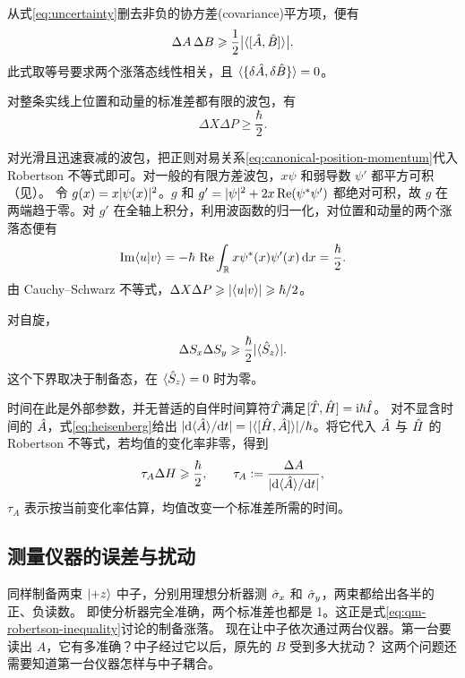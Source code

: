 \begin{corollary}
    从式\eqref{eq:uncertainty}删去非负的协方差(covariance)平方项，便有
    \begin{equation}\label{eq:qm-robertson-inequality}
        \Delta A\,\Delta B \geqslant \frac12\bigl\lvert\langle[\hat{A},\hat{B}]\rangle\bigr\rvert.
    \end{equation}
    此式取等号要求两个涨落态线性相关，且 $\langle\{\delta \hat{A},\delta \hat{B}\}\rangle = 0$。
\end{corollary}

\begin{corollary}
    对整条实线上位置和动量的标准差都有限的波包，有
    \begin{equation}
        \Delta X \Delta P \geq \frac\hbar2.
    \end{equation}
\end{corollary}
对光滑且迅速衰减的波包，把正则对易关系\eqref{eq:canonical-position-momentum}代入 Robertson 不等式即可。对一般的有限方差波包，$x\psi$ 和弱导数 $\psi'$ 都平方可积（见）。
令 $g(x) = x\lvert\psi(x)\rvert^2$。$g$ 和 $g' = \lvert\psi\rvert^2 + 2x\operatorname{Re}(\psi^\ast\psi')$ 都绝对可积，故 $g$ 在两端趋于零。对 $g'$ 在全轴上积分，利用波函数的归一化，对位置和动量的两个涨落态便有
\[
    \operatorname{Im}\langle u\vert v\rangle = -\hbar\,\operatorname{Re}\int_{\mathbb{R}} x\psi^\ast(x)\psi'(x)\mathop{}\!\mathrm{d} x = \frac{\hbar}{2} .
\]
由 Cauchy--Schwarz 不等式，$\Delta X\Delta P \geqslant \lvert\langle u\vert v\rangle\rvert \geqslant \hbar/2$。
\begin{corollary}
    对自旋，
    \begin{equation}
        \Delta S_x \Delta S_y \geqslant \frac{\hbar}{2}\lvert\langle\hat{S}_z\rangle\rvert.
    \end{equation}
    这个下界取决于制备态，在 $\langle\hat{S}_z\rangle = 0$ 时为零。
\end{corollary}

时间在此是外部参数，并无普适的自伴时间算符$\hat{T}$满足$[\hat{T},\hat{H}] = \mathrm{i}\hbar\hat{I}$。
对不显含时间的 $\hat{A}$，式\eqref{eq:heisenberg}给出 $\lvert\mathop{}\!\mathrm{d}\langle\hat{A}\rangle/\mathrm{d} t\rvert = \lvert\langle[\hat{H},\hat{A}]\rangle\rvert/\hbar$。将它代入 $\hat{A}$ 与 $\hat{H}$ 的 Robertson 不等式，若均值的变化率非零，得到
\begin{equation}
    \tau_A\Delta H \geqslant \frac\hbar2,\qquad
    \tau_A := \frac{\Delta A}{\lvert\mathop{}\!\mathrm{d}\langle\hat{A}\rangle/\mathrm{d} t\rvert},
\end{equation}
$\tau_A$ 表示按当前变化率估算，均值改变一个标准差所需的时间。

\subsection{测量仪器的误差与扰动}
\label{ss:qm-error-disturbance}
同样制备两束 $\lvert+z\rangle$ 中子，分别用理想分析器测 $\hat{\sigma}_x$ 和 $\hat{\sigma}_y$，两束都给出各半的正、负读数。
即使分析器完全准确，两个标准差也都是 1。这正是式\eqref{eq:qm-robertson-inequality}讨论的制备涨落。
现在让中子依次通过两台仪器。第一台要读出 $A$，它有多准确？中子经过它以后，原先的 $B$ 受到多大扰动？
这两个问题还需要知道第一台仪器怎样与中子耦合。

